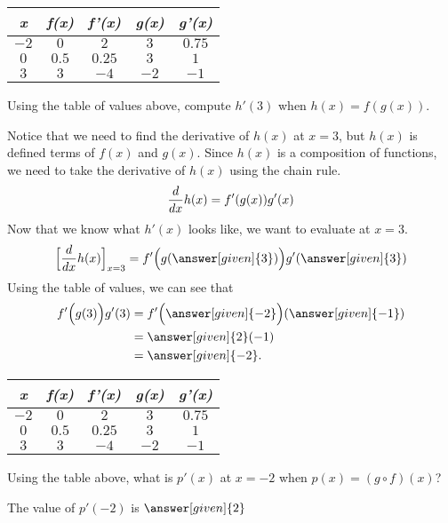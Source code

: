 \documentclass{ximera}
\begin{document}
\begin{problem}
\begin{center}
\begin{tabular}{|c|c|c|c|c|}
\hline
\phantom{..}\textbf{\emph{x}}\phantom{..} & \phantom{..}\textbf{\emph{f(x)}}\phantom{..} & \phantom{..}\textbf{\emph{f'(x)}}\phantom{..} & \phantom{..}\textbf{\emph{g(x)}}\phantom{..} & \phantom{..}\textbf{\emph{g'(x)}}\phantom{..}\\
\hline
$-2$ & $0$ & $2$ & $3$ & $0.75$\\
\hline
$0$ & $0.5$ & $0.25$ & $3$ & $1$\\
\hline
$3$ & $3$ & $-4$ & $-2$ & $-1$\\
\hline
\end{tabular}
\end{center}


Using the table of values above, compute $h'(3)$ when $h(x) = f(g(x))$.

\begin{explanation}
Notice that we need to find the derivative of $h(x)$ at $x=3$, but $h(x)$ is defined terms of $f(x)$ and $g(x)$. Since $h(x)$ is a composition of functions, we need to take the derivative of $h(x)$ using the chain rule.
\[
\frac{d}{\mathop{}\!d x} h(x) = f'(g(x))g'(x)
\]
Now that we know what $h'(x)$ looks like, we want to evaluate at $x=3$.
\[
\Big[\ddx h(x) \Big]_{x=3} = f'\Big(g(\answer[given]{3})\Big)g'(\answer[given]{3})
\]
Using the table of values, we can see that 
\[
\begin{aligned}
f'\Big(g(3)\Big)g'(3) &= f'\Big( \answer[given]{-2}\Big) (\answer[given]{-1}) \\
 &= \answer[given]{2} (-1)\\
 &= \answer[given]{-2}.
\end{aligned}
\]
\end{explanation}

\end{problem}

\begin{problem}
\begin{center}
\begin{tabular}{|c|c|c|c|c|}
\hline
\phantom{..}\textbf{\emph{x}}\phantom{..} & \phantom{..}\textbf{\emph{f(x)}}\phantom{..} & \phantom{..}\textbf{\emph{f'(x)}}\phantom{..} & \phantom{..}\textbf{\emph{g(x)}}\phantom{..} & \phantom{..}\textbf{\emph{g'(x)}}\phantom{..}\\
\hline
$-2$ & $0$ & $2$ & $3$ & $0.75$\\
\hline
$0$ & $0.5$ & $0.25$ & $3$ & $1$\\
\hline
$3$ & $3$ & $-4$ & $-2$ & $-1$\\
\hline
\end{tabular}
\end{center}

Using the table above, what is $p'(x)$ at $x=-2$ when $p(x) = (g \circ f)(x)$?

\begin{prompt}
   The value of $p'(-2)$ is $\answer[given]{2}$
\end{prompt}

\end{problem}
\end{document}
